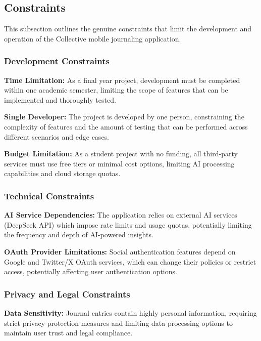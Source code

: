 \subsection{Constraints}\label{subsec:constraints}

This subsection outlines the genuine constraints that limit the development and operation of the Collective mobile journaling application.

\subsubsection{Development Constraints}

\textbf{Time Limitation:} As a final year project, development must be completed within one academic semester, limiting the scope of features that can be implemented and thoroughly tested.

\textbf{Single Developer:} The project is developed by one person, constraining the complexity of features and the amount of testing that can be performed across different scenarios and edge cases.

\textbf{Budget Limitation:} As a student project with no funding, all third-party services must use free tiers or minimal cost options, limiting AI processing capabilities and cloud storage quotas.

\subsubsection{Technical Constraints}

\textbf{AI Service Dependencies:} The application relies on external AI services (DeepSeek API) which impose rate limits and usage quotas, potentially limiting the frequency and depth of AI-powered insights.

\textbf{OAuth Provider Limitations:} Social authentication features depend on Google and Twitter/X OAuth services, which can change their policies or restrict access, potentially affecting user authentication options.

\subsubsection{Privacy and Legal Constraints}

\textbf{Data Sensitivity:} Journal entries contain highly personal information, requiring strict privacy protection measures and limiting data processing options to maintain user trust and legal compliance.

